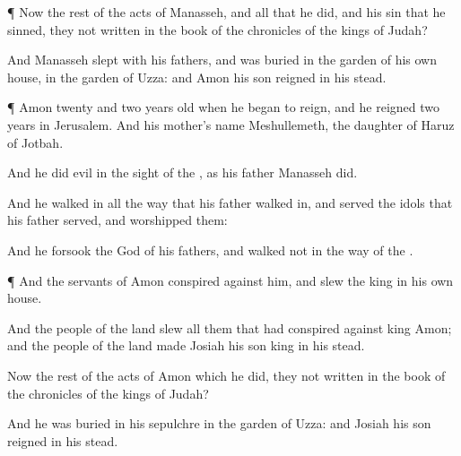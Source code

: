 {\par }{\PP {}¶ Now the
rest of the
acts of
Manasseh, and all that he
did, and his
sin that he
sinned,
{} they not
written in the
book of the
chronicles of the
kings of
Judah?

And
Manasseh
slept with his
fathers, and was
buried in the
garden of his own
house, in the
garden of
Uzza: and
Amon his
son
reigned in his stead.


\par }{\PP {}¶
Amon
{}
twenty and
two
years
old when he began to
reign, and he
reigned
two
years in
Jerusalem. And his
mother’s
name
{}
Meshullemeth, the
daughter of
Haruz of
Jotbah.

And he
did
{}
evil in the
sight of the
{}, as his
father
Manasseh
did.

And he
walked in all the
way that his
father walked
in, and
served the
idols that his
father
served, and
worshipped them:

And he
forsook the
{}
God of his
fathers, and
walked not in the
way of the
{}.


\par }{\PP {}¶ And the
servants of
Amon
conspired against him, and
slew the
king in his own
house.

And the
people of the
land
slew all them that had
conspired against
king
Amon; and the
people of the
land made
Josiah his
son
king in his stead.

Now the
rest of the
acts of
Amon which he
did,
{} they not
written in the
book of the
chronicles of the
kings of
Judah?

And he was
buried in his
sepulchre in the
garden of
Uzza: and
Josiah his
son
reigned in his stead.




\par }
